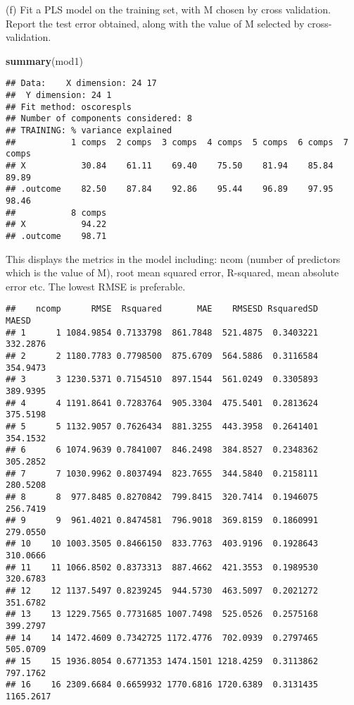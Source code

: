 \documentclass[
  ignorenonframetext,
]{beamer}
\newenvironment{Shaded}{\begin{snugshade}}{\end{snugshade}}
\newcommand{\KeywordTok}[1]{\textcolor[rgb]{0.13,0.29,0.53}{\textbf{#1}}}
\newcommand{\NormalTok}[1]{#1}
\newcommand{\OperatorTok}[1]{\textcolor[rgb]{0.81,0.36,0.00}{\textbf{#1}}}
\begin{document}
\begin{frame}[fragile]{(f) Fit a PLS model on the training set, with M
chosen by cross validation. Report the test error obtained, along with
the value of M selected by cross-validation.}
\begin{Shaded}
\begin{Highlighting}[]
\KeywordTok{summary}\NormalTok{(mod1)}
\end{Highlighting}
\end{Shaded}

\begin{verbatim}
## Data:    X dimension: 24 17 
##  Y dimension: 24 1
## Fit method: oscorespls
## Number of components considered: 8
## TRAINING: % variance explained
##           1 comps  2 comps  3 comps  4 comps  5 comps  6 comps  7 comps
## X           30.84    61.11    69.40    75.50    81.94    85.84    89.89
## .outcome    82.50    87.84    92.86    95.44    96.89    97.95    98.46
##           8 comps
## X           94.22
## .outcome    98.71
\end{verbatim}

This displays the metrics in the model including: ncom (number of
predictors which is the value of M), root mean squared error, R-squared,
mean absolute error etc. The lowest RMSE is preferable.

\begin{Shaded}
\end{Shaded}

\begin{verbatim}
##    ncomp      RMSE  Rsquared       MAE    RMSESD RsquaredSD     MAESD
## 1      1 1084.9854 0.7133798  861.7848  521.4875  0.3403221  332.2876
## 2      2 1180.7783 0.7798500  875.6709  564.5886  0.3116584  354.9473
## 3      3 1230.5371 0.7154510  897.1544  561.0249  0.3305893  389.9395
## 4      4 1191.8641 0.7283764  905.3304  475.5401  0.2813624  375.5198
## 5      5 1132.9057 0.7626434  881.3255  443.3958  0.2641401  354.1532
## 6      6 1074.9639 0.7841007  846.2498  384.8527  0.2348362  305.2852
## 7      7 1030.9962 0.8037494  823.7655  344.5840  0.2158111  280.5208
## 8      8  977.8485 0.8270842  799.8415  320.7414  0.1946075  256.7419
## 9      9  961.4021 0.8474581  796.9018  369.8159  0.1860991  279.0550
## 10    10 1003.3505 0.8466150  833.7763  403.9196  0.1928643  310.0666
## 11    11 1066.8502 0.8373313  887.4662  421.3553  0.1989530  320.6783
## 12    12 1137.5497 0.8239245  944.5730  463.5097  0.2021272  351.6782
## 13    13 1229.7565 0.7731685 1007.7498  525.0526  0.2575168  399.2797
## 14    14 1472.4609 0.7342725 1172.4776  702.0939  0.2797465  505.0709
## 15    15 1936.8054 0.6771353 1474.1501 1218.4259  0.3113862  797.1762
## 16    16 2309.6684 0.6659932 1770.6816 1720.6389  0.3131435 1165.2617
\end{verbatim}

\end{frame}
\end{document}
